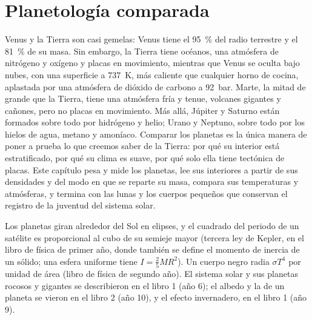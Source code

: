 \chapter{Planetología comparada}\label{ch:b1:comparative-planetology}

Venus y la Tierra son casi gemelas: Venus tiene el \qty{95}{\percent} del radio terrestre y
el \qty{81}{\percent} de su masa. Sin embargo, la Tierra tiene océanos, una atmósfera de
nitrógeno y oxígeno y placas en movimiento, mientras que Venus se oculta bajo nubes, con una
superficie a \qty{737}{K}, más caliente que cualquier horno de cocina, aplastada por una
atmósfera de dióxido de carbono a \qty{92}{bar}. Marte, la mitad de grande que la Tierra,
tiene una atmósfera fría y tenue, volcanes gigantes y cañones, pero no placas en movimiento.
Más allá, Júpiter y Saturno están formados sobre todo por hidrógeno y helio; Urano y Neptuno,
sobre todo por los hielos de agua, metano y amoníaco. Comparar los planetas es la única manera
de poner a prueba lo que creemos saber de la Tierra: por qué su interior está estratificado,
por qué su clima es suave, por qué solo ella tiene tectónica de placas. Este capítulo pesa y
mide los planetas, lee sus interiores a partir de sus densidades y del modo en que se reparte
su masa, compara sus temperaturas y atmósferas, y termina con las lunas y los cuerpos
pequeños que conservan el registro de la juventud del sistema solar.

\begin{recall}
Los planetas giran alrededor del Sol en elipses, y el cuadrado del periodo de un satélite es
proporcional al cubo de su semieje mayor (tercera ley de Kepler, en el libro de física de
primer año, donde también se define el momento de inercia de un sólido; una esfera uniforme
tiene $I = \tfrac25MR^2$). Un cuerpo negro radia $\sigma T^4$ por unidad de área (libro de
física de segundo año). El sistema solar y sus planetas rocosos y gigantes se describieron en
el libro 1 (año 6); el albedo y la  de un planeta se vieron en el
libro 2 (año 10), y el efecto invernadero, en el libro 1 (año 9).
\end{recall}


